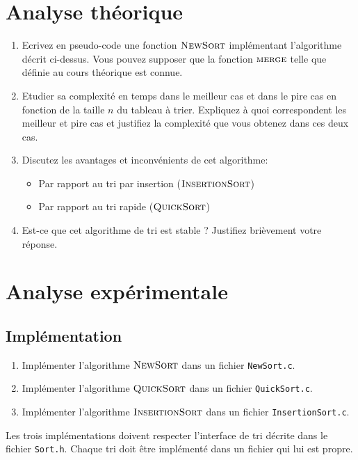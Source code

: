 \documentclass[a4paper,10pt]{article}
\begin{document}
\bigskip

\section{Analyse théorique}
\begin{enumerate}
\item Ecrivez en pseudo-code une fonction $\textnormal{\scshape NewSort}$
  implémentant l'algorithme décrit ci-dessus. Vous pouvez supposer que la fonction
  $\textnormal{\scshape merge}$ telle que définie au cours théorique est connue.
\item Etudier sa complexité en temps dans le meilleur cas et dans le
  pire cas en fonction de la taille $n$ du tableau à trier. Expliquez
  à quoi correspondent les meilleur et pire cas et justifiez la
  complexité que vous obtenez dans ces deux cas.
\item Discutez les avantages et inconvénients de cet algorithme:
\begin{itemize}
\item Par rapport au tri par insertion ($\textnormal{\scshape InsertionSort}$)
\item Par rapport au tri rapide ($\textnormal{\scshape QuickSort}$)
\end{itemize}
\item Est-ce que cet algorithme de tri est stable ? Justifiez brièvement votre réponse.
\end{enumerate}

\section{Analyse expérimentale}

\subsection{Implémentation}

\begin{enumerate}
\item Implémenter l'algorithme $\textnormal{\scshape NewSort}$ dans un fichier \texttt{NewSort.c}.
\item Implémenter l'algorithme $\textnormal{\scshape QuickSort}$ dans un fichier \texttt{QuickSort.c}.
\item Implémenter l'algorithme $\textnormal{\scshape InsertionSort}$ dans un fichier \texttt{InsertionSort.c}.
\end{enumerate}

Les trois implémentations doivent respecter l'interface de tri décrite dans le
fichier \texttt{Sort.h}. Chaque tri doit être implémenté dans un fichier qui lui
est propre.
\end{document}
